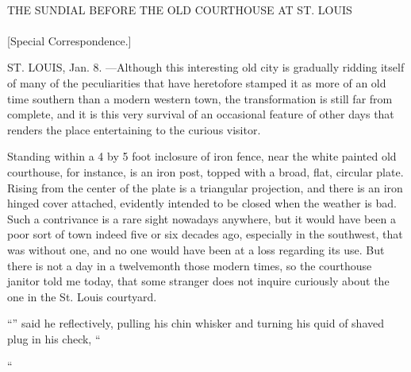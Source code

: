 \begin{ipquote}
\begin{center}
\\
THE SUNDIAL BEFORE THE OLD COURTHOUSE AT ST. LOUIS\\
\\
{[Special Correspondence.]}    
\end{center}
ST. LOUIS, Jan. 8. —Although this interesting old city is gradually ridding itself of many of the peculiarities that have heretofore stamped it as more of an old time southern than a modern western town, the transformation is still far from complete, and it is this very survival of an occasional feature of other days that renders the place entertaining to the curious visitor.

Standing within a 4 by 5 foot inclosure of iron fence, near the white painted old courthouse, for instance, is an iron post, topped with a broad, flat, circular plate. Rising from the center of the plate is a triangular projection, and there is an iron hinged cover attached, evidently intended to be closed when the weather is bad. Such a contrivance is a rare sight nowadays anywhere, but it would have been a poor sort of town indeed five or six decades ago, especially in the southwest, that was without one, and no one would have been at a loss regarding its use. But there is not a day in a twelvemonth those modern times, so the courthouse janitor told me today, that some stranger do{\kern0pt}es not inquire curiously about the one in the St. Louis courtyard.

“” said he reflectively, pulling his chin whisker and turning his quid of shaved plug in his check, “

{“

}
\end{ipquote}
